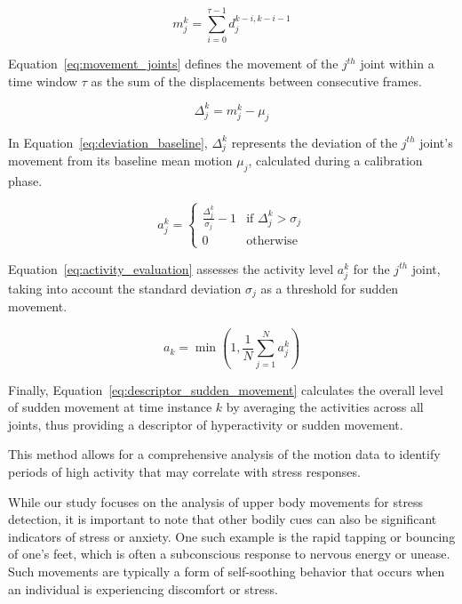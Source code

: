 \begin{equation}
m_j^k = \sum_{i=0}^{\tau-1} d_j^{k-i,k-i-1}
\label{eq:movement_joints}
\end{equation}

Equation~\ref{eq:movement_joints} defines the movement of the \( j^{th} \) joint within a time window \( \tau \) as the sum of the displacements between consecutive frames. 

\begin{equation}
\Delta_j^k = m_j^k - \mu_j
\label{eq:deviation_baseline}
\end{equation}

In Equation~\ref{eq:deviation_baseline}, \( \Delta_j^k \) represents the deviation of the \( j^{th} \) joint's movement from its baseline mean motion \( \mu_j \), calculated during a calibration phase.

\begin{equation}
a_j^k = 
\begin{cases} 
  \frac{\Delta_j^k}{\sigma_j} - 1 & \text{if } \Delta_j^k > \sigma_j \\
  0 & \text{otherwise}
\end{cases}
\label{eq:activity_evaluation}
\end{equation}

Equation~\ref{eq:activity_evaluation} assesses the activity level \( a_j^k \) for the \( j^{th} \) joint, taking into account the standard deviation \( \sigma_j \) as a threshold for sudden movement.

\begin{equation}
a_k = \min \left( 1, \frac{1}{N} \sum_{j=1}^{N} a_j^k \right)
\label{eq:descriptor_sudden_movement}
\end{equation}

Finally, Equation~\ref{eq:descriptor_sudden_movement} calculates the overall level of sudden movement at time instance \( k \) by averaging the activities across all joints, thus providing a descriptor of hyperactivity or sudden movement.

This method allows for a comprehensive analysis of the motion data to identify periods of high activity that may correlate with stress responses.


While our study focuses on the analysis of upper body movements for stress detection, it is important to note that other bodily cues can also be significant indicators of stress or anxiety. One such example is the rapid tapping or bouncing of one's feet, which is often a subconscious response to nervous energy or unease. Such movements are typically a form of self-soothing behavior that occurs when an individual is experiencing discomfort or stress.


